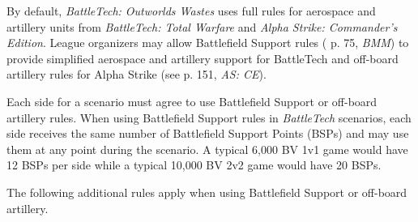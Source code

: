By default, \emph{BattleTech: Outworlds Wastes} uses full rules for aerospace and artillery units from \emph{BattleTech: Total Warfare} and \emph{Alpha Strike: Commander's Edition}.
League organizers may allow Battlefield Support rules ( p. 75, \emph{BMM}) to provide simplified aerospace and artillery support for BattleTech and off-board artillery rules for Alpha Strike (see p. 151, \emph{AS: CE}).

Each side for a scenario must agree to use Battlefield Support or off-board artillery rules.
When using Battlefield Support rules in \emph{BattleTech} scenarios, each side receives the same number of Battlefield Support Points (BSPs) and may use them at any point during the scenario.
A typical 6,000 BV 1v1 game would have 12 BSPs per side while a typical 10,000 BV 2v2 game would have 20 BSPs.

The following additional rules apply when using Battlefield Support or off-board artillery.

